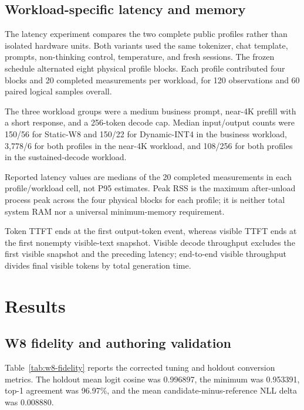 \documentclass[10pt]{article}
\DeclareRobustCommand{\evidence}[1]{}
\begin{document}
\subsection{Workload-specific latency and memory}

The latency experiment compares the two complete public profiles rather than isolated hardware units. Both variants used the same tokenizer, chat template, prompts, non-thinking control, temperature, and fresh sessions. The frozen schedule alternated eight physical profile blocks. Each profile contributed four blocks and 20 completed measurements per workload, for 120 observations and 60 paired logical samples overall.\evidence{CL-17,CL-18,CL-19}

The three workload groups were a medium business prompt, near-4K prefill with a short response, and a 256-token decode cap. Median input/output counts were 150/56 for Static-W8 and 150/22 for Dynamic-INT4 in the business workload, 3,778/6 for both profiles in the near-4K workload, and 108/256 for both profiles in the sustained-decode workload.\evidence{CL-17,CL-18,CL-19}

Reported latency values are medians of the 20 completed measurements in each profile/workload cell, not P95 estimates. Peak RSS is the maximum after-unload process peak across the four physical blocks for each profile; it is neither total system RAM nor a universal minimum-memory requirement.\evidence{CL-16,CL-17,CL-18,CL-19}

Token TTFT ends at the first output-token event, whereas visible TTFT ends at the first nonempty visible-text snapshot. Visible decode throughput excludes the first visible snapshot and the preceding latency; end-to-end visible throughput divides final visible tokens by total generation time.\evidence{CL-17,CL-18,CL-19}

\section{Results}

\subsection{W8 fidelity and authoring validation}

Table~\ref{tab:w8-fidelity} reports the corrected tuning and holdout conversion metrics. The holdout mean logit cosine was 0.996897, the minimum was 0.953391, top-1 agreement was 96.97\%, and the mean candidate-minus-reference NLL delta was 0.008880.\evidence{CL-07}
\end{document}
